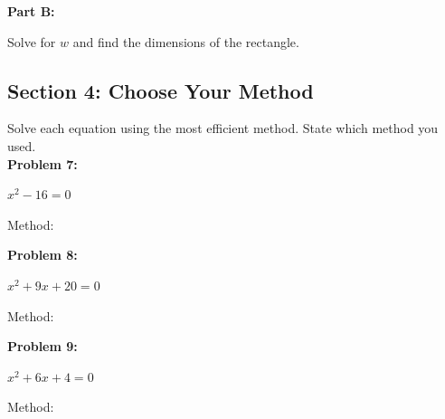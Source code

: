 \documentclass[12pt]{article}
\begin{document}
			\vspace{3cm}

			\textbf{Part B:}
            
            Solve for $w$ and find the dimensions of the rectangle.

			\newpage

		\subsection*{Section 4: Choose Your Method}

			Solve each equation using the most efficient method.  State which method you used.\\

			\textbf{Problem 7:}
            
            $x^2 - 16 = 0$

			\vspace{3.9cm}

			Method: \underline{\hspace{2in}}

			\vspace{1cm}

			\textbf{Problem 8:}
            
            $x^2 + 9x + 20 = 0$

			\vspace{3.9cm}

			Method: \underline{\hspace{2in}}

			\vspace{1cm}

			\textbf{Problem 9:}
            
            $x^2 + 6x + 4 = 0$

			\vspace{3.9cm}

			Method: \underline{\hspace{2in}}

			\newpage
\end{document}
